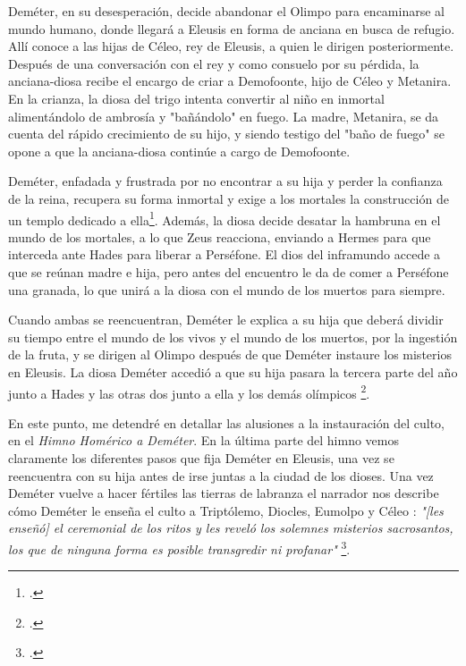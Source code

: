 Deméter, en su desesperación, decide abandonar el Olimpo para encaminarse al mundo humano, donde llegará a Eleusis en forma de anciana en busca de refugio. Allí conoce a las hijas de Céleo, rey de Eleusis, a quien le dirigen posteriormente. Después de una conversación con el rey y como consuelo por su pérdida, la anciana-diosa recibe el encargo de criar a Demofoonte, hijo de Céleo y Metanira. En la crianza, la diosa del trigo intenta convertir al niño en inmortal alimentándolo de ambrosía y "bañándolo" en fuego. La madre, Metanira, se da cuenta del rápido crecimiento de su hijo, y siendo testigo del "baño de fuego" se opone a que la anciana-diosa continúe a cargo de Demofoonte. 

Deméter, enfadada y frustrada por no encontrar a su hija y perder la confianza de la reina, recupera su forma inmortal y exige a los mortales la construcción de un templo dedicado a ella\footcite[54-73]{b.torresHimnoHomericoDemeter2001}. Además, la diosa decide desatar la hambruna en el mundo de los mortales, a lo que Zeus reacciona, enviando a Hermes para que interceda ante Hades para liberar a Perséfone. El dios del inframundo accede a que se reúnan madre e hija, pero antes del encuentro le da de comer a Perséfone una granada, lo que unirá a la diosa con el mundo de los muertos para siempre.

Cuando ambas se reencuentran, Deméter le explica a su hija que deberá dividir su tiempo entre el mundo de los vivos y el mundo de los muertos, por la ingestión de la fruta, y se dirigen al Olimpo después de que Deméter instaure los misterios en Eleusis. La diosa Deméter accedió a que su hija pasara la tercera parte del año junto a Hades y las otras dos junto a ella y los demás olímpicos \footcite[74-89]{b.torresHimnoHomericoDemeter2001}.

En este punto, me detendré en detallar las alusiones a la instauración del culto, en el \textit{Himno Homérico a Deméter}. En la última parte del himno vemos claramente los diferentes pasos que fija Deméter en Eleusis, una vez se reencuentra con su hija antes de irse juntas a la ciudad de los dioses. Una vez Deméter vuelve a hacer fértiles las tierras de labranza el narrador nos describe cómo Deméter le enseña el culto a Triptólemo, Diocles, Eumolpo y Céleo                                                                         : 
\textit{"[les enseñó] el ceremonial de los ritos y les reveló los solemnes misterios sacrosantos, los que de ninguna forma es posible transgredir ni profanar"} \footcite[89]{b.torresHimnoHomericoDemeter2001}.

